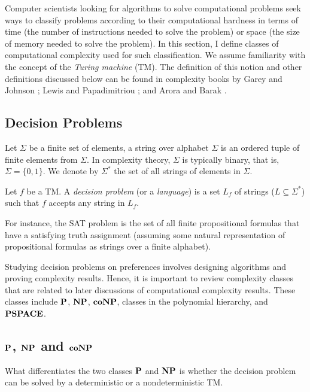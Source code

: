 Computer scientists looking for algorithms to solve computational problems
seek ways to classify problems according to their computational hardness
in terms of time (the number of instructions needed to solve the problem) 
or space (the size of memory needed to solve the problem).
In this section, I define classes of computational
complexity used for such classification.
We assume familiarity with the concept of the \textit{Turing machine} (TM).
The definition of this notion and other definitions discussed 
below can be found in complexity
books by Garey and Johnson \cite{gar-joh:b:int}; Lewis and Papadimitriou
\cite{Lewis:Comput}; and Arora and Barak \cite{Arora:Comput}.



\subsection{Decision Problems}
Let $\Sigma$ be a finite set of elements, a string over alphabet $\Sigma$
is an ordered tuple of finite elements from $\Sigma$. In complexity theory,
$\Sigma$ is typically binary, that is, $\Sigma=\{0,1\}$.
We denote by $\Sigma^*$ the set of all strings of elements in $\Sigma$.

\begin{definition}
	Let $f$ be a TM.
	A \textit{decision problem} (or a \textit{language}) is a set 
	$L_f$ of strings ($L \subseteq \Sigma^*$) such that $f$ accepts
	any string in $L_f$.
\end{definition}
For instance, the SAT problem is the set of all finite propositional
formulas that have a satisfying truth assignment (assuming some natural
representation of propositional formulas as strings over a finite alphabet).

Studying decision problems on preferences involves designing algorithms and
proving complexity results.  Hence, it is important to review complexity classes
that are related to later discussions of computational complexity results.
These classes include $\textbf{P}$, $\textbf{NP}$, $\textbf{coNP}$, classes in the polynomial
hierarchy, and $\textbf{PSPACE}$.


\subsection{$\textbf{P}$, $\textbf{NP}$ and $\textbf{coNP}$}
What differentiates the two classes $\textbf{P}$ and $\textbf{NP}$ is whether the decision problem
can be solved by a deterministic or a nondeterministic TM. \cite{Arora:Comput}

